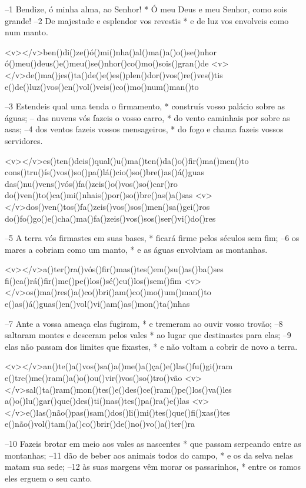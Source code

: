 –1 Bendize, ó minha alma, ao Senhor! *
Ó meu Deus e meu Senhor, como sois grande! 
–2 De majestade e esplendor vos revestis *
e de luz vos envolveis como num manto.

<v></v>ben()di()ze()ó()mi()nha()al()ma()a()o()se()nhor
ó()meu()deus()e()meu()se()nhor()co()mo()sois()gran()de
<v></v>de()ma()jes()ta()de()e()es()plen()dor()vos()re()ves()tis
e()de()luz()vos()en()vol()veis()co()mo()num()man()to

–3 Estendeis qual uma tenda o firmamento, *
construís vosso palácio sobre as águas; 
– das nuvens vós fazeis o vosso carro, *
do vento caminhais por sobre as asas; 
–4 dos ventos fazeis vossos mensageiros, *
do fogo e chama fazeis vossos servidores.

<v></v>es()ten()deis()qual()u()ma()ten()da()o()fir()ma()men()to
cons()tru()ís()vos()so()pa()lá()cio()so()bre()as()á()guas
das()nu()vens()vós()fa()zeis()o()vos()so()car()ro
do()ven()to()ca()mi()nhais()por()so()bre()as()a()sas
<v></v>dos()ven()tos()fa()zeis()vos()sos()men()sa()gei()ros
do()fo()go()e()cha()ma()fa()zeis()vos()sos()ser()vi()do()res

–5 A terra vós firmastes em suas bases, *
ficará firme pelos séculos sem fim; 
–6 os mares a cobriam como um manto, *
e as águas envolviam as montanhas.

<v></v>a()ter()ra()vós()fir()mas()tes()em()su()as()ba()ses
fi()ca()rá()fir()me()pe()los()sé()cu()los()sem()fim
<v></v>os()ma()res()a()co()bri()am()co()mo()um()man()to
e()as()á()guas()en()vol()vi()am()as()mon()ta()nhas

–7 Ante a vossa ameaça elas fugiram, *
e tremeram ao ouvir vosso trovão; 
–8 saltaram montes e desceram pelos vales *
ao lugar que destinastes para elas; 
–9 elas não passam dos limites que fixastes, *
e não voltam a cobrir de novo a terra.

<v></v>an()te()a()vos()sa()a()me()a()ça()e()las()fu()gi()ram
e()tre()me()ram()a()o()ou()vir()vos()so()tro()vão
<v></v>sal()ta()ram()mon()tes()e()des()ce()ram()pe()los()va()les
a()o()lu()gar()que()des()ti()nas()tes()pa()ra()e()las
<v></v>e()las()não()pas()sam()dos()li()mi()tes()que()fi()xas()tes
e()não()vol()tam()a()co()brir()de()no()vo()a()ter()ra

–10 Fazeis brotar em meio aos vales as nascentes *
que passam serpeando entre as montanhas; 
–11 dão de beber aos animais todos do campo, *
e os da selva nelas matam sua sede; 
–12 às suas margens vêm morar os passarinhos, *
entre os ramos eles erguem o seu canto.

